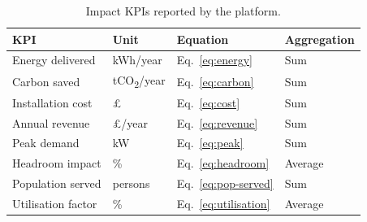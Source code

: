 \begin{table}[htbp]
\centering
\caption{Impact KPIs reported by the platform.}
\label{tab:kpis}
\small
\begin{tabular}{llll}
\toprule
\textbf{KPI} & \textbf{Unit} & \textbf{Equation} & \textbf{Aggregation} \\
\midrule
Energy delivered & kWh/year & Eq.~\ref{eq:energy} & Sum \\
Carbon saved & tCO\textsubscript{2}/year & Eq.~\ref{eq:carbon} & Sum \\
Installation cost & \pounds & Eq.~\ref{eq:cost} & Sum \\
Annual revenue & \pounds/year & Eq.~\ref{eq:revenue} & Sum \\
Peak demand & kW & Eq.~\ref{eq:peak} & Sum \\
Headroom impact & \% & Eq.~\ref{eq:headroom} & Average \\
Population served & persons & Eq.~\ref{eq:pop-served} & Sum \\
Utilisation factor & \% & Eq.~\ref{eq:utilisation} & Average \\
\bottomrule
\end{tabular}
\end{table}

